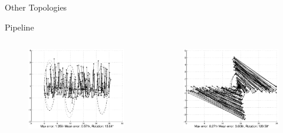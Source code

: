 \documentclass{beamer}
\begin{document}
\begin{frame}{Other Topologies}
\begin{block}{Pipeline}
\begin{columns}
	\begin{column}[T]{0.5\textwidth}
		\begin{figure}
			\centering
				\includegraphics[width=\textwidth]{pipeline/spread}
		\end{figure}
	\end{column}
	\begin{column}[T]{0.5\textwidth}
		\begin{figure}
			\centering
				\includegraphics[width=\textwidth]{pipeline/clumped}
		\end{figure}
	\end{column}
\end{columns}
\end{block}
\end{frame}
\end{document}
